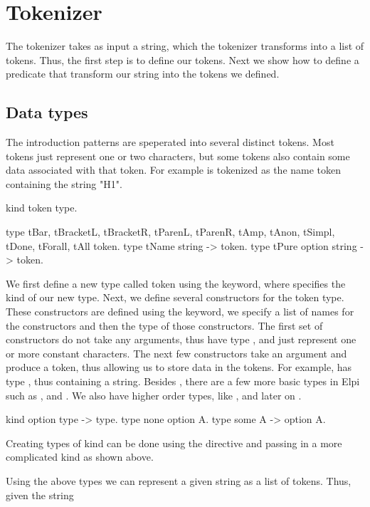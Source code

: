 \documentclass[thesis.tex]{subfiles}
\begin{document}
{\section{Tokenizer}\label{ssec:tokenizer}
The tokenizer takes as input a string, which the tokenizer transforms into a list of tokens. Thus, the first step is to define our tokens. Next we show how to define a predicate that transform our string into the tokens we defined.

\subsection{Data types}\label{sssec:datatypes}
The introduction patterns are speperated into several distinct tokens. Most tokens just represent one or two characters, but some tokens also contain some data associated with that token. For example  is tokenized as the name token containing the string "H1".
\begin{elpicode}
  kind token type.

  type tBar, tBracketL, tBracketR, tParenL, tParenR,
       tAmp, tAnon, tSimpl, tDone, tForall, tAll token.
  type tName string -> token.
  type tPure option string -> token.
\end{elpicode}
We first define a new type called token using the  keyword, where  specifies the kind of our new type. Next, we define several constructors for the token type. These constructors are defined using the  keyword, we specify a list of names for the constructors and then the type of those constructors. The first set of constructors do not take any arguments, thus have type , and just represent one or more constant characters. The next few constructors take an argument and produce a token, thus allowing us to store data in the tokens. For example,  has type , thus containing a string. Besides , there are a few more basic types in Elpi such as ,  and . We also have higher order types, like , and later on .
\begin{elpicode}
  kind option type -> type.
  type none option A.
  type some A -> option A.
\end{elpicode}
Creating types of kind  can be done using the  directive and passing in a more complicated kind as shown above.

Using the above types we can represent a given string as a list of tokens. Thus, given the string \elpii{"[H %
\begin{center}
    \elpii{[tBracketL, tName "H", tPure (some "H'"), tBracketR]}
\end{center}

}}
\end{document}
